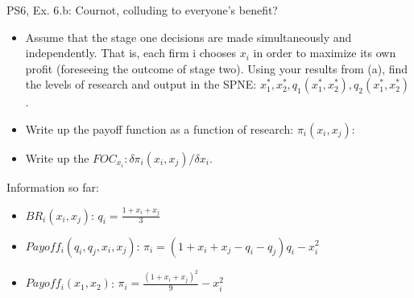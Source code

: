 \begin{frame}{PS6, Ex. 6.b: Cournot, colluding to everyone's benefit?}
    \begin{itemize}
    \item[(b)] Assume that the stage one decisions are made simultaneously and independently. That is, each firm i chooses $x_i$ in order to maximize its own profit (foreseeing the outcome of stage two). Using your results from (a), find the levels of research and output in the SPNE: $x_1^*,x_2^*,q_1(x_1^*,x_2^*),q_2(x_1^*,x_2^*)$.
    \end{itemize}
  \begin{multicols}{2}
    \begin{itemize}
      \item[(Step a)] Write up the payoff function as a function of research: $\pi_i(x_i,x_j)$:
      \item[(Step b)] Write up the $FOC_{x_i}:\delta\pi_i(x_i,x_j)/\delta x_i$.
    \end{itemize}
    \vfill\null \columnbreak
    Information so far:
    \begin{itemize}
    \item[1] $BR_i(x_i,x_j)$: $q_i = \frac{1+x_i+x_j}{3}$
    \item[2] $Payoff_i(q_i,q_j,x_i,x_j)$: $\pi_i=(1+x_i+x_j-q_i-q_j)q_i-x_i^2$
    \item[3] $Payoff_i(x_1,x_2)$: $\pi_i=\frac{(1+x_i+x_j)^2}{9}-x_i^2$
    \end{itemize}
    \vfill\null
  \end{multicols}
\end{frame}
